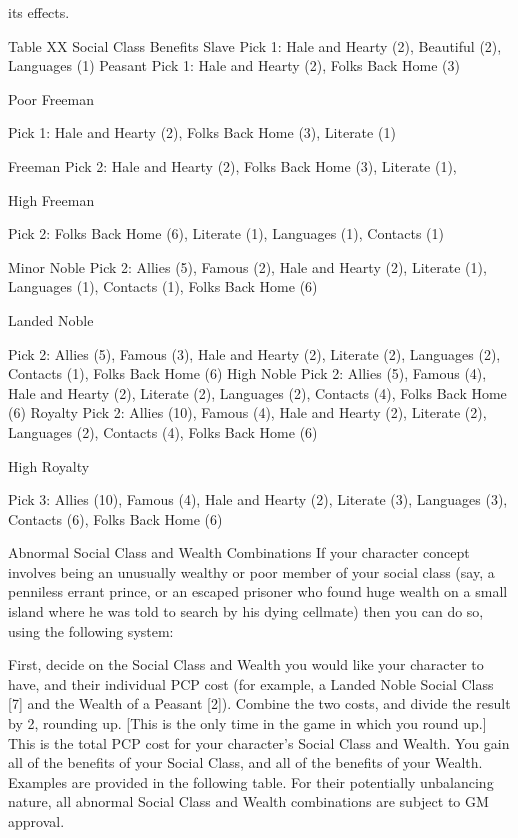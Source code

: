 \documentclass[oneside,11pt,english]{book}
\begin{document}
its effects. 

 
Table XX Social Class Benefits 
Slave Pick 1: Hale and Hearty (2), Beautiful (2), Languages (1) 
Peasant Pick 1: Hale and Hearty (2), Folks Back Home (3) 

Poor 
Freeman 

Pick 1: Hale and Hearty (2), Folks Back Home (3), Literate (1) 

Freeman Pick 2: Hale and Hearty (2), Folks Back Home (3), Literate (1), 

High 
Freeman 

Pick 2: Folks Back Home (6), Literate (1), Languages (1), Contacts (1) 

Minor Noble Pick 2: Allies (5), Famous (2), Hale and Hearty (2), Literate (1), Languages (1), Contacts (1), Folks 
Back Home (6) 

Landed 
Noble 

Pick 2: Allies (5), Famous (3), Hale and Hearty (2), Literate (2), Languages (2), Contacts (1), Folks 
Back Home (6) 
High Noble Pick 2: Allies (5), Famous (4), Hale and Hearty (2), Literate (2), Languages (2), Contacts (4), Folks 
Back Home (6) 
Royalty Pick 2: Allies (10), Famous (4), Hale and Hearty (2), Literate (2), Languages (2), Contacts (4), 
Folks Back Home (6) 

High 
Royalty 

Pick 3: Allies (10), Famous (4), Hale and Hearty (2), Literate (3), Languages (3), Contacts (6), 
Folks Back Home (6) 

 

Abnormal Social Class and Wealth Combinations 
If your character concept involves being an unusually wealthy or poor member of your social class (say, a 
penniless errant prince, or an escaped prisoner who found huge wealth on a small island where he was 
told to search by his dying cellmate) then you can do so, using the following system: 

 

First, decide on the Social Class and Wealth you would like your character to have, and their individual 
PCP cost (for example, a Landed Noble Social Class [7] and the Wealth of a Peasant [2]). 
Combine the two costs, and divide the result by 2, rounding up. [This is the only time in the game in 
which you round up.] 
This is the total PCP cost for your character’s Social Class and Wealth. You gain all of the benefits of 
your Social Class, and all of the benefits of your Wealth. Examples are provided in the following table. 
For their potentially unbalancing nature, all abnormal Social Class and Wealth combinations are subject 
to GM approval. 
\end{document}

